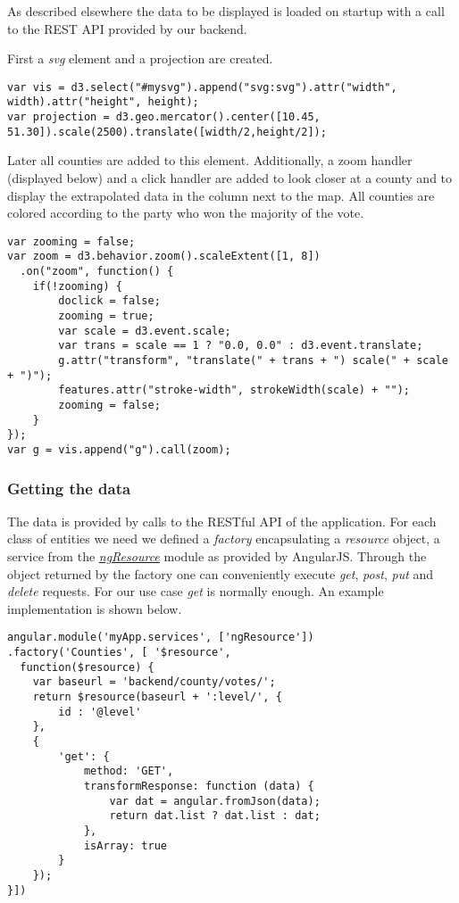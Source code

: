 As described elsewhere the data to be displayed is loaded on startup
with a call to the REST API provided by our backend.

First a \emph{svg} element and a projection are created.

\begin{lstlisting}
var vis = d3.select("#mysvg").append("svg:svg").attr("width", width).attr("height", height); 
var projection = d3.geo.mercator().center([10.45, 51.30]).scale(2500).translate([width/2,height/2]);
\end{lstlisting}


Later all counties are added to this element. Additionally, a zoom
handler (displayed below) and a click handler are added to look closer
at a county and to display the extrapolated data in the column next to
the map. All counties are colored according to the party who won the
majority of the vote.


\begin{lstlisting}
var zooming = false;
var zoom = d3.behavior.zoom().scaleExtent([1, 8])
  .on("zoom", function() {
    if(!zooming) {
        doclick = false;
        zooming = true;
        var scale = d3.event.scale;
        var trans = scale == 1 ? "0.0, 0.0" : d3.event.translate;
        g.attr("transform", "translate(" + trans + ") scale(" + scale + ")");
        features.attr("stroke-width", strokeWidth(scale) + "");
        zooming = false;
    }
});
var g = vis.append("g").call(zoom);
\end{lstlisting}


\subsubsection{Getting the data}\label{getting-the-data}

The data is provided by calls to the RESTful API of the application. For
each class of entities we need we defined a \emph{factory} encapsulating
a \emph{resource} object, a service from the
\href{http://docs.angularjs.org/api/ngResource}{\emph{ngResource}}
module as provided by AngularJS. Through the object returned by the
factory one can conveniently execute \emph{get}, \emph{post}, \emph{put}
and \emph{delete} requests. For our use case \emph{get} is normally
enough. An example implementation is shown below.



\begin{lstlisting}
angular.module('myApp.services', ['ngResource'])
.factory('Counties', [ '$resource',
  function($resource) {
	var baseurl = 'backend/county/votes/';
	return $resource(baseurl + ':level/', {
		id : '@level'
	},
    {
        'get': {
            method: 'GET',
            transformResponse: function (data) {
            	var dat = angular.fromJson(data);
            	return dat.list ? dat.list : dat;
            },
            isArray: true
        }
    });
}])
\end{lstlisting}


